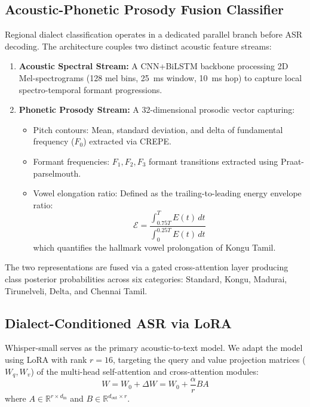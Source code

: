 \documentclass[conference]{IEEEtran}
\begin{document}
\subsection{Acoustic-Phonetic Prosody Fusion Classifier}
Regional dialect classification operates in a dedicated parallel branch before ASR decoding. The architecture couples two distinct acoustic feature streams:
\begin{enumerate}
    \item \textbf{Acoustic Spectral Stream:} A CNN+BiLSTM backbone processing 2D Mel-spectrograms (128 mel bins, 25~ms window, 10~ms hop) to capture local spectro-temporal formant progressions.
    \item \textbf{Phonetic Prosody Stream:} A 32-dimensional prosodic vector capturing:
    \begin{itemize}
        \item Pitch contours: Mean, standard deviation, and delta of fundamental frequency ($F_0$) extracted via CREPE.
        \item Formant frequencies: $F_1, F_2, F_3$ formant transitions extracted using Praat-parselmouth.
        \item Vowel elongation ratio: Defined as the trailing-to-leading energy envelope ratio:
        \begin{equation}
        \mathcal{E} = \frac{\int_{0.75 T}^{T} E(t)\,dt}{\int_{0}^{0.25 T} E(t)\,dt}
        \end{equation}
        which quantifies the hallmark vowel prolongation of Kongu Tamil.
    \end{itemize}
\end{enumerate}
The two representations are fused via a gated cross-attention layer producing class posterior probabilities across six categories: Standard, Kongu, Madurai, Tirunelveli, Delta, and Chennai Tamil.

\subsection{Dialect-Conditioned ASR via LoRA}
Whisper-small serves as the primary acoustic-to-text model. We adapt the model using LoRA with rank $r=16$, targeting the query and value projection matrices ($W_q, W_v$) of the multi-head self-attention and cross-attention modules:
\begin{equation}
W = W_0 + \Delta W = W_0 + \frac{\alpha}{r} B A
\end{equation}
where $A \in \mathbb{R}^{r \times d_{\text{in}}}$ and $B \in \mathbb{R}^{d_{\text{out}} \times r}$. 
\end{document}
